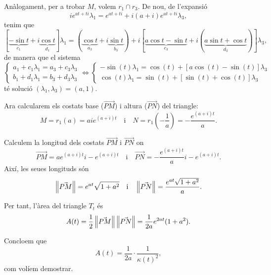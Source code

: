 \documentclass[a4paper, 11pt]{article}
\begin{document}
\begin{solution}
    Anàlogament, per a trobar $M$, volem $r_1 \cap r_3$. De nou, de
    l'expansió
    \[
      i e^{at + ti} \lambda_1 
      = e^{at + ti} + i(a + i)e^{at + ti} \lambda_3,
    \]
    tenim que
    \[
      [\underbrace{-\sin t}_{c_1}
      + i\underbrace{\cos t}_{d_1}
      ] \lambda_1
      = (\underbrace{\cos t}_{a_3}
      + i\underbrace{\sin t}_{b_3})
      + i[\underbrace{a\cos t - \sin t}_{c_3}
      + i (\underbrace{a\sin t + \cos t}_{d_3})
      ] \lambda_3,
    \]
    de manera que el sistema
    \[
      \begin{cases}
        a_1 + c_1 \lambda_1 = a_3 + c_3 \lambda_3 \\
        b_1 + d_1 \lambda_1 = b_3 + d_3 \lambda_3
      \end{cases}
      \iff
      \begin{cases}
        -\sin (t) \lambda_1 = \cos (t) +
        \left[a\cos (t) - \sin (t)\right] \lambda_3 \\
        \cos (t) \lambda_1 = \sin (t) +
        \left[\sin (t) + \cos (t)\right] \lambda_3
      \end{cases}
    \]
    té solució $(\lambda_1, \lambda_3) = (a, 1)$.

    Ara calcularem els costats base ($\vec{PM}$) i altura ($\vec{PN}$) del triangle:
    \[
      M = r_1(a) = ai e^{(a + i)t} \quad \text{i} \quad
      N = r_1\left(-\frac{1}{a}\right) = -\frac{e^{(a + i)t}}{a}.
    \]

    Calculem la longitud dels costats $\vec{PM}$ i $\vec{PN}$ on
    \[
      \vec{PM} = ae^{(a + i)t}i - e^{(a + i)t}
      \quad \text{i} \quad
      \vec{PN} = -\frac{e^{(a + i)t}}{a}i - e^{(a + i)t}.
    \]
    Així, les seues longituds són
    \[
      \left\lVert\vec{PM}\right\rVert = e^{at} \sqrt{1 + a^2}
      \quad \text{i} \quad
      \left\lVert\vec{PN}\right\rVert = \frac{e^{at} \sqrt{1 + a^2}}{a}.
    \]
    
    Per tant, l'àrea del triangle $T_t$ és
    \[
      A(t) = \frac{1}{2} \left\lVert\vec{PM}\right\rVert \left\lVert\vec{PN}\right\rVert
      = \frac{1}{2a} e^{2at} (1 + a^2).
    \]

    Concloem que
    \[
      A(t) = \frac{1}{2a} \cdot \frac{1}{\kappa(t)^2},
    \]
    com volíem demostrar.
  \end{solution}
\end{document}
